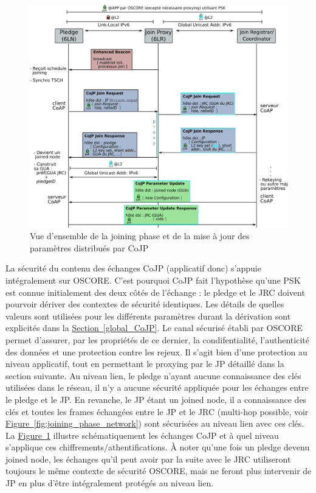 \documentclass[]{report}
\newcommand{\wordlink}[2]{\hyperref[#2]{#1~\ref{#2}}}
\begin{document}
	\begin{figure}[!ht]
	\centering
	\includegraphics[width=\linewidth]{joining_phase_simplified}
	\caption{Vue d'ensemble de la joining phase et de la mise à jour des paramètres distribués par CoJP}
	\label{fig:joining_phase_simplified}
	\end{figure}

\vspace{0.3cm}

La sécurité du contenu des échanges CoJP (applicatif donc) s'appuie intégralement sur OSCORE. C'est pourquoi CoJP fait l'hypothèse qu'une PSK est connue initialement des deux côtés de l'échange : le pledge et le JRC doivent pourvoir dériver des contextes de sécurité identiques. Les détails de quelles valeurs sont utilisées pour les différents paramètres durant la dérivation sont explicités dans la \wordlink{Section}{global_CoJP}. Le canal sécurisé établi par OSCORE permet d'assurer, par les propriétés de ce dernier, la condifentialité, l'authenticité des données et une protection contre les rejeux. Il s'agit bien d'une protection au niveau applicatif, tout en permettant le proxying par le JP détaillé dans la section suivante. Au niveau lien, le pledge n'ayant aucune connaissance des clés utilisées dans le réseau, il n'y a aucune sécurité appliquée pour les échanges entre le pledge et le JP. En revanche, le JP étant un joined node, il a connaissance des clés et toutes les frames échangées entre le JP et le JRC (multi-hop possible, voir \wordlink{Figure}{fig:joining_phase_network}) sont sécurisées au niveau lien avec ces clés. La \wordlink{Figure}{fig:joining_phase_simplified} illustre schématiquement les échanges CoJP et à quel niveau s'applique ces chiffrements/athentifications. À noter qu'une fois un pledge devenu joined node, les échanges qu'il peut avoir par la suite avec le JRC utiliseront toujours le même contexte de sécurité OSCORE, mais ne feront plus intervenir de JP en plus d'être intégralement protégés au niveau lien.
\end{document}
